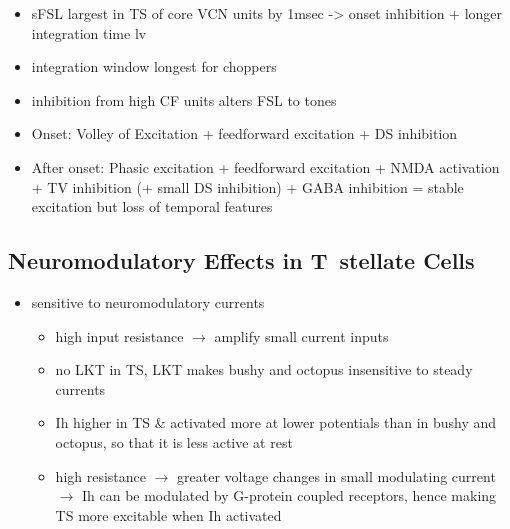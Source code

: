\begin{itemize}
\item sFSL largest in TS of core VCN units by 1msec -> onset inhibition + longer integration time \citep{GisbergenGrashuisEtAl:1975,GisbergenGrashuisEtAl:1975a,GisbergenGrashuisEtAl:1975b,YoungRobertEtAl:1988,PaoliniClareyEtAl:2004}
  lv\item integration window longest for choppers \citep{McGinleyOertel:2006}
\item inhibition from high CF units alters FSL to tones \citep{Wickesberg:1996}
\item Onset: Volley of Excitation + feedforward excitation + DS inhibition
\item After onset: Phasic excitation + feedforward excitation + NMDA activation + TV inhibition (+ small DS inhibition) + GABA inhibition = stable excitation but loss of temporal features
\end{itemize}

\citep{JorisSmithEtAl:1994}


\subsection{Neuromodulatory Effects in T~stellate Cells}




\begin{itemize}
\item sensitive to neuromodulatory currents \citep{FujinoOertel:2001}
\begin{itemize}
\item high input resistance $\rightarrow$ amplify small current inputs \citep{FujinoOertel:2001}
\item no LKT in TS,  LKT makes bushy and octopus insensitive to steady currents \citep{OertelFujino:2001,McGinleyOertel:2006}
\item Ih higher in TS \& activated more at lower potentials than in bushy and octopus, so that it is less active at rest
\item high resistance $\rightarrow$ greater voltage changes in small modulating current $\rightarrow$ Ih can be modulated by G-protein coupled receptors, hence making TS more excitable when Ih activated \citep{RodriguesOertel:2006}
\end{itemize}
\end{itemize}

